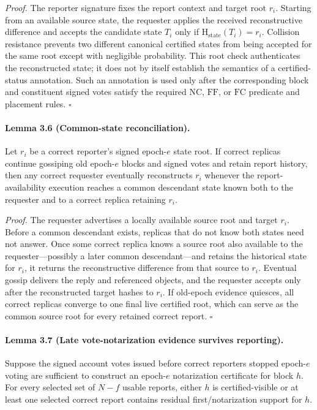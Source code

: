 \documentclass[10pt,twocolumn]{article}
\newcommand{\NC}{\mathrm{NC}}
\newcommand{\FC}{\mathrm{FC}}
\newcommand{\FF}{\mathrm{FF}}
\newcommand{\StateHash}{\mathrm{H}_{\mathrm{state}}}
\begin{document}
\emph{Proof.} The reporter signature fixes the report context and target root $r_i$. Starting from an available source state, the requester applies the received reconstructive difference and accepts the candidate state $T_i$ only if $\StateHash(T_i)=r_i$. Collision resistance prevents two different canonical certified states from being accepted for the same root except with negligible probability. This root check authenticates the reconstructed state; it does not by itself establish the semantics of a certified-status annotation. Such an annotation is used only after the corresponding block and constituent signed votes satisfy the required $\NC$, $\FF$, or $\FC$ predicate and placement rules. $\square$

\paragraph{Lemma 3.6 (Common-state reconciliation).} Let $r_i$ be a correct reporter's signed epoch-$e$ state root. If correct replicas continue gossiping old epoch-$e$ blocks and signed votes and retain report history, then any correct requester eventually reconstructs $r_i$ whenever the report-availability execution reaches a common descendant state known both to the requester and to a correct replica retaining $r_i$.

\emph{Proof.} The requester advertises a locally available source root and target $r_i$. Before a common descendant exists, replicas that do not know both states need not answer. Once some correct replica knows a source root also available to the requester---possibly a later common descendant---and retains the historical state for $r_i$, it returns the reconstructive difference from that source to $r_i$. Eventual gossip delivers the reply and referenced objects, and the requester accepts only after the reconstructed target hashes to $r_i$. If old-epoch evidence quiesces, all correct replicas converge to one final live certified root, which can serve as the common source root for every retained correct report. $\square$

\paragraph{Lemma 3.7 (Late vote-notarization evidence survives reporting).} Suppose the signed account votes issued before correct reporters stopped epoch-$e$ voting are sufficient to construct an epoch-$e$ notarization certificate for block $h$. For every selected set of $N-f$ usable reports, either $h$ is certified-visible or at least one selected correct report contains residual first/notarization support for $h$.
\end{document}
